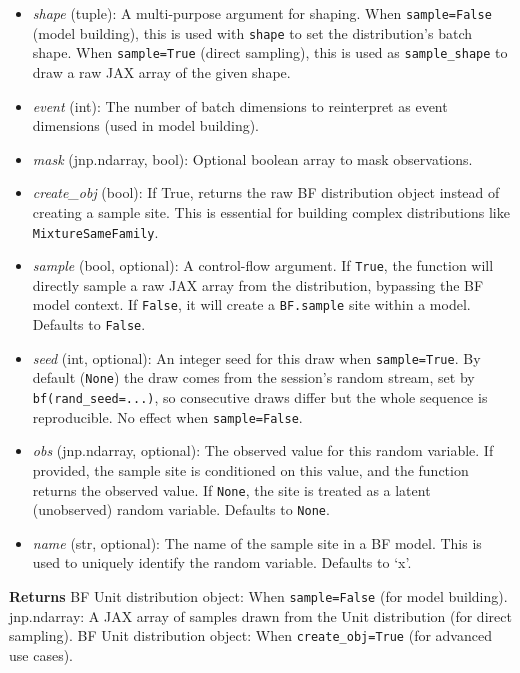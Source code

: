 \documentclass[
  letterpaper,
  DIV=11,
  numbers=noendperiod]{scrartcl}
\begin{document}
\begin{itemize}
\item
  \emph{shape} (tuple): A multi-purpose argument for shaping. When
  \texttt{sample=False} (model building), this is used with
  \texttt{shape} to set the distribution's batch shape. When
  \texttt{sample=True} (direct sampling), this is used as
  \texttt{sample\_shape} to draw a raw JAX array of the given shape.
\item
  \emph{event} (int): The number of batch dimensions to reinterpret as
  event dimensions (used in model building).
\item
  \emph{mask} (jnp.ndarray, bool): Optional boolean array to mask
  observations.
\item
  \emph{create\_obj} (bool): If True, returns the raw BF distribution
  object instead of creating a sample site. This is essential for
  building complex distributions like \texttt{MixtureSameFamily}.
\item
  \emph{sample} (bool, optional): A control-flow argument. If
  \texttt{True}, the function will directly sample a raw JAX array from
  the distribution, bypassing the BF model context. If \texttt{False},
  it will create a \texttt{BF.sample} site within a model. Defaults to
  \texttt{False}.
\item
  \emph{seed} (int, optional): An integer seed for this draw when
  \texttt{sample=True}. By default (\texttt{None}) the draw comes from
  the session's random stream, set by \texttt{bf(rand\_seed=...)}, so
  consecutive draws differ but the whole sequence is reproducible. No
  effect when \texttt{sample=False}.
\item
  \emph{obs} (jnp.ndarray, optional): The observed value for this random
  variable. If provided, the sample site is conditioned on this value,
  and the function returns the observed value. If \texttt{None}, the
  site is treated as a latent (unobserved) random variable. Defaults to
  \texttt{None}.
\item
  \emph{name} (str, optional): The name of the sample site in a BF
  model. This is used to uniquely identify the random variable. Defaults
  to `x'.
\end{itemize}

\textbf{Returns} BF Unit distribution object: When \texttt{sample=False}
(for model building). jnp.ndarray: A JAX array of samples drawn from the
Unit distribution (for direct sampling). BF Unit distribution object:
When \texttt{create\_obj=True} (for advanced use cases).
\end{document}
